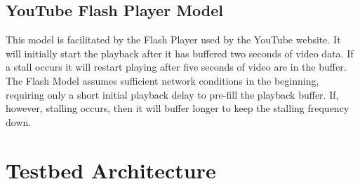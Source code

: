   
\subsection{YouTube Flash Player Model}
This model is facilitated by the Flash Player used by the YouTube website. It will initially start the playback after it has buffered two seconds of video data. If a stall occurs it will restart playing after five seconds of video are in the buffer.
The Flash Model assumes sufficient network conditions in the beginning, requiring only a short initial playback delay to pre-fill the playback buffer. If, however, stalling occurs, then it will buffer longer to keep the stalling frequency down.







\section{Testbed Architecture}
\label{sec:testbed}

